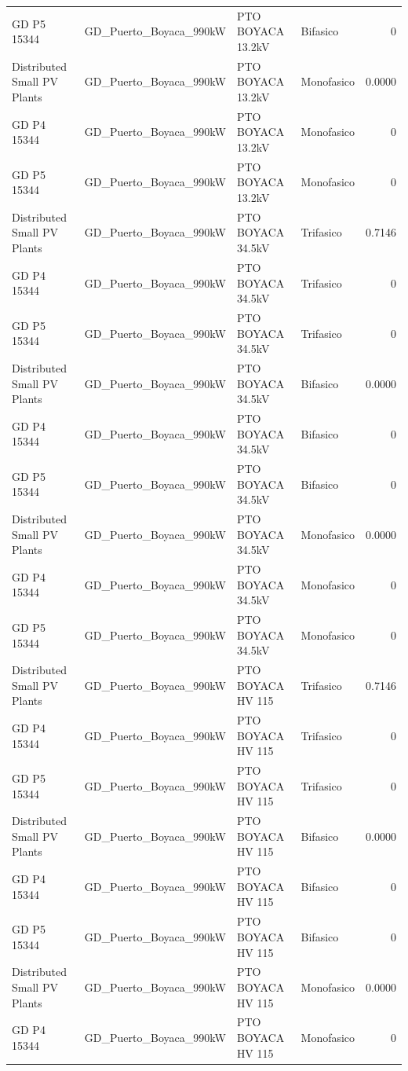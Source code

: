 \documentclass[11pt,a4paper]{article}
\begin{document}
\begin{longtable}{llllr}
GD P5 15344 & GD\_Puerto\_Boyaca\_990kW & PTO BOYACA 13.2kV & Bifasico & 0 \\
Distributed Small PV Plants & GD\_Puerto\_Boyaca\_990kW & PTO BOYACA 13.2kV & Monofasico & 0.0000 \\
GD P4 15344 & GD\_Puerto\_Boyaca\_990kW & PTO BOYACA 13.2kV & Monofasico & 0 \\
GD P5 15344 & GD\_Puerto\_Boyaca\_990kW & PTO BOYACA 13.2kV & Monofasico & 0 \\
Distributed Small PV Plants & GD\_Puerto\_Boyaca\_990kW & PTO BOYACA 34.5kV & Trifasico & 0.7146 \\
GD P4 15344 & GD\_Puerto\_Boyaca\_990kW & PTO BOYACA 34.5kV & Trifasico & 0 \\
GD P5 15344 & GD\_Puerto\_Boyaca\_990kW & PTO BOYACA 34.5kV & Trifasico & 0 \\
Distributed Small PV Plants & GD\_Puerto\_Boyaca\_990kW & PTO BOYACA 34.5kV & Bifasico & 0.0000 \\
GD P4 15344 & GD\_Puerto\_Boyaca\_990kW & PTO BOYACA 34.5kV & Bifasico & 0 \\
GD P5 15344 & GD\_Puerto\_Boyaca\_990kW & PTO BOYACA 34.5kV & Bifasico & 0 \\
Distributed Small PV Plants & GD\_Puerto\_Boyaca\_990kW & PTO BOYACA 34.5kV & Monofasico & 0.0000 \\
GD P4 15344 & GD\_Puerto\_Boyaca\_990kW & PTO BOYACA 34.5kV & Monofasico & 0 \\
GD P5 15344 & GD\_Puerto\_Boyaca\_990kW & PTO BOYACA 34.5kV & Monofasico & 0 \\
Distributed Small PV Plants & GD\_Puerto\_Boyaca\_990kW & PTO BOYACA HV 115 & Trifasico & 0.7146 \\
GD P4 15344 & GD\_Puerto\_Boyaca\_990kW & PTO BOYACA HV 115 & Trifasico & 0 \\
GD P5 15344 & GD\_Puerto\_Boyaca\_990kW & PTO BOYACA HV 115 & Trifasico & 0 \\
Distributed Small PV Plants & GD\_Puerto\_Boyaca\_990kW & PTO BOYACA HV 115 & Bifasico & 0.0000 \\
GD P4 15344 & GD\_Puerto\_Boyaca\_990kW & PTO BOYACA HV 115 & Bifasico & 0 \\
GD P5 15344 & GD\_Puerto\_Boyaca\_990kW & PTO BOYACA HV 115 & Bifasico & 0 \\
Distributed Small PV Plants & GD\_Puerto\_Boyaca\_990kW & PTO BOYACA HV 115 & Monofasico & 0.0000 \\
GD P4 15344 & GD\_Puerto\_Boyaca\_990kW & PTO BOYACA HV 115 & Monofasico & 0 \\

\end{longtable}
\end{document}
